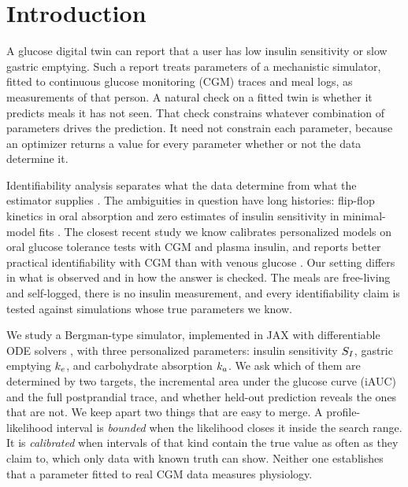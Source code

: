 \section{Introduction}
\label{sec:intro}

A glucose digital twin can report that a user has low insulin sensitivity or slow gastric emptying.
Such a report treats parameters of a mechanistic simulator, fitted to continuous glucose monitoring (CGM) traces and meal logs, as measurements of that person.
A natural check on a fitted twin is whether it predicts meals it has not seen.
That check constrains whatever combination of parameters drives the prediction.
It need not constrain each parameter, because an optimizer returns a value for every parameter whether or not the data determine it.

Identifiability analysis separates what the data determine from what the estimator supplies \citep[see][for reviews]{cobelli1980parameter,miao2011identifiability,villaverde2016structural}.
The ambiguities in question have long histories: flip-flop kinetics in oral absorption \citep{boxenbaum1998flipflop,yanez2011flipflop} and zero estimates of insulin sensitivity in minimal-model fits \citep{pillonetto2002minimal}.
The closest recent study we know calibrates personalized models on oral glucose tolerance tests with CGM and plasma insulin, and reports better practical identifiability with CGM than with venous glucose \citep{erdos2024leveraging}.
Our setting differs in what is observed and in how the answer is checked.
The meals are free-living and self-logged, there is no insulin measurement, and every identifiability claim is tested against simulations whose true parameters we know.

We study a Bergman-type simulator, implemented in JAX with differentiable ODE solvers \citep{bradbury2018jax,kidger2021diffrax}, with three personalized parameters: insulin sensitivity $S_I$, gastric emptying $k_e$, and carbohydrate absorption $k_a$.
We ask which of them are determined by two targets, the incremental area under the glucose curve (iAUC) and the full postprandial trace, and whether held-out prediction reveals the ones that are not.
We keep apart two things that are easy to merge.
A profile-likelihood interval is \emph{bounded} when the likelihood closes it inside the search range.
It is \emph{calibrated} when intervals of that kind contain the true value as often as they claim to, which only data with known truth can show.
Neither one establishes that a parameter fitted to real CGM data measures physiology.

